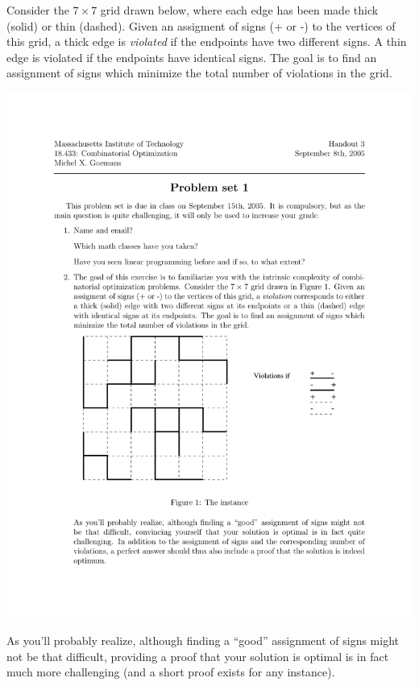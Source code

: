 \documentclass[12pt]{article}
\begin{document}

Consider the
$7\times 7$ grid drawn below, where each edge has been made thick (solid) or thin (dashed). Given an assigment of
signs (+ or -) to the vertices of this grid, a thick edge is {\it violated} if the endpoints have two different signs. A thin edge is violated if the endpoints have identical signs. The goal is to find an assignment of signs which minimize
the total number of violations in the grid. 

\begin{center}
\includegraphics{../figures/maxcut6}
\end{center}

As you'll probably realize, although finding a ``good'' assignment of
signs might not be that difficult, providing a proof  that your
solution is optimal is in fact much more challenging (and a short proof exists for any instance). 


\end{document}

